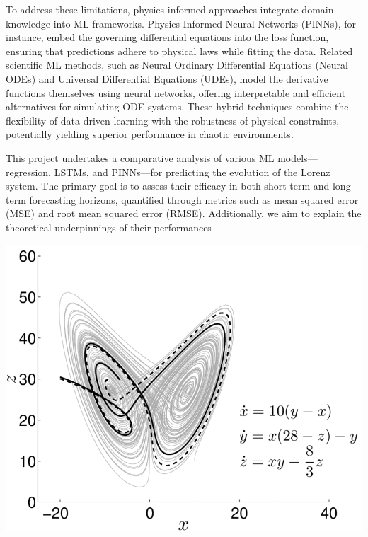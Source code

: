 \documentclass[12pt]{article}
\begin{document}
To address these limitations, physics-informed approaches integrate domain knowledge into ML frameworks. Physics-Informed Neural Networks (PINNs), for instance, embed the governing differential equations into the loss function, ensuring that predictions adhere to physical laws while fitting the data. Related scientific ML methods, such as Neural Ordinary Differential Equations (Neural ODEs) and Universal Differential Equations (UDEs), model the derivative functions themselves using neural networks, offering interpretable and efficient alternatives for simulating ODE systems\cite{kashyap2024modeling}. These hybrid techniques combine the flexibility of data-driven learning with the robustness of physical constraints, potentially yielding superior performance in chaotic environments.

This project undertakes a comparative analysis of various ML models—regression, LSTMs, and PINNs—for predicting the evolution of the Lorenz system. The primary goal is to assess their efficacy in both short-term and long-term forecasting horizons, quantified through metrics such as mean squared error (MSE) and root mean squared error (RMSE). Additionally, we aim to explain the theoretical underpinnings of their performances

\includegraphics[scale=0.4]{img.png}



\end{document}

